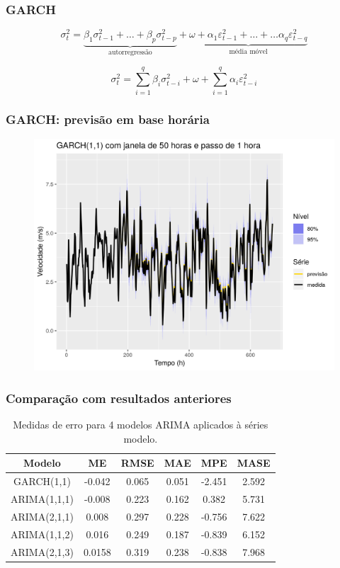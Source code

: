 \documentclass[mathserif,serif]{beamer}
\begin{document}
\begin{frame}
	\frametitle{GARCH}
	
	\begin{equation*}
		\sigma_t^2 = \underbrace{\beta_1\sigma_{t-1}^2 + \dots + \beta_p\sigma_{t-p}^2}_\text{autorregressão}  + \underbrace{\omega + \alpha_1\varepsilon_{t-1}^2 + \dots + \dots \alpha_q\varepsilon_{t-q}^2}_\text{média móvel} 
	\end{equation*}
	
	\begin{equation*}
		\sigma_t^2 = \sum\limits_{i=1}^q\beta_i\sigma_{t-i}^2 + \omega + \sum\limits_{i=1}^q\alpha_i\varepsilon_{t-i}^2
	\end{equation*}
\end{frame}
	
\begin{frame}
	\frametitle{GARCH: previsão em base horária}
	\begin{figure}
		\centering
		\includegraphics[scale=0.6]{garch_first}
	\end{figure}
\end{frame}

\begin{frame}
	\frametitle{Comparação com resultados anteriores}

	\begin{table}[h]
		\centering
		\begin{tabular}{ |c|c|c|c|c|c| } 
			\hline
			\textbf{Modelo}&\textbf{ME}&\textbf{RMSE}&\textbf{MAE}&\textbf{MPE}&\textbf{MASE}\\
			\hline
			GARCH(1,1)&-0.042&0.065&0.051&-2.451&2.592 \\
			\hline
			ARIMA(1,1,1)&-0.008&0.223&0.162&0.382&5.731 \\
			\hline
			ARIMA(2,1,1)&0.008&0.297&0.228&-0.756&7.622 \\
			\hline
			ARIMA(1,1,2)&0.016&0.249&0.187&-0.839&6.152 \\
			\hline
			ARIMA(2,1,3)&0.0158&0.319&0.238&-0.838&7.968 \\
			\hline
		\end{tabular}
		\caption{Medidas de erro para 4 modelos ARIMA aplicados à séries modelo.}
	\end{table}
\end{frame}	
	
\end{document}
